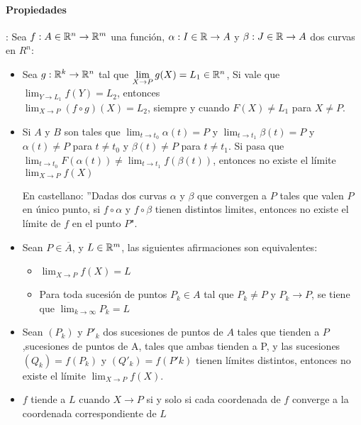 \paragraph{Propiedades}:
Sea $f : A\in\mathbb{R}^n\rightarrow \mathbb{R}^m$ una función, $\alpha : I\in\mathbb{R}\rightarrow A$ y $
\beta : J\in\mathbb{R}\rightarrow A$ dos curvas en $R^n$:
\begin{itemize}
\item Sea $g : \mathbb{R}^k\rightarrow \mathbb{R}^n$ tal que $\lim_{X\to P}\limits g(X) = L_1\in\mathbb{R}^n$, Si vale que $\lim_{Y\to L_1}\limits f(Y) = L_2$, entonces\\ $\lim_{X\to P}\limits (f\circ g)(X) = L_2$, siempre y cuando $F(X)\neq L_1$ para $X\neq P$.
\item Si $A$ y $B$ son tales que 
$\lim_{t\to t_0}\limits \alpha(t) = P$ y $\lim_{t\to t_1}\limits \beta(t) = P$ y $\alpha(t) \neq P$ para $t\neq t_0$ y $\beta(t)\neq P$ para $t\neq t_1$. Si pasa que $\lim_{t\to t_0}\limits  F(\alpha(t)) \neq \lim_{t\to t_1}\limits  f(\beta(t))$, entonces no existe el límite $\lim_{X\to P}\limits f(X)$
\begin{center}
\begin{minipage}{0.9\textwidth}
En castellano: ''Dadas dos curvas $\alpha$ y $\beta$ que convergen a $P$ tales que valen $P$ en único punto, si  $f\circ \alpha$ y $f\circ \beta$ tienen distintos limites, entonces no existe el límite de $f$ en el punto $P$".
\end{minipage}
\end{center}
\item Sean $P\in\overline{A}$, y $L\in\mathbb{R}^m$, las siguientes afirmaciones son equivalentes:
\begin{itemize}
\item $\lim_{X\to P}f(X) = L$
\item Para toda sucesión de puntos $P_k\in A$ tal que $P_k\neq P$ y $P_k\to P$, se tiene que $\lim_{k\to\infty}P_k = L$
\end{itemize}


\item Sean $(P_k)$ y $P'_k$ dos sucesiones de puntos de $A$ tales que tienden a $P$,sucesiones de puntos de A, tales que ambas tienden a P, y las
sucesiones $(Q_k) = f(P_k)$ y $(Q'_k) = f(P'k)$ tienen límites distintos, entonces no existe el límite $\lim_{X\to P} f(X)$.

\item $f$ tiende a $L$ cuando $X\to P$ si y solo si cada coordenada de $f$ converge a la coordenada correspondiente de $L$
\end{itemize}

